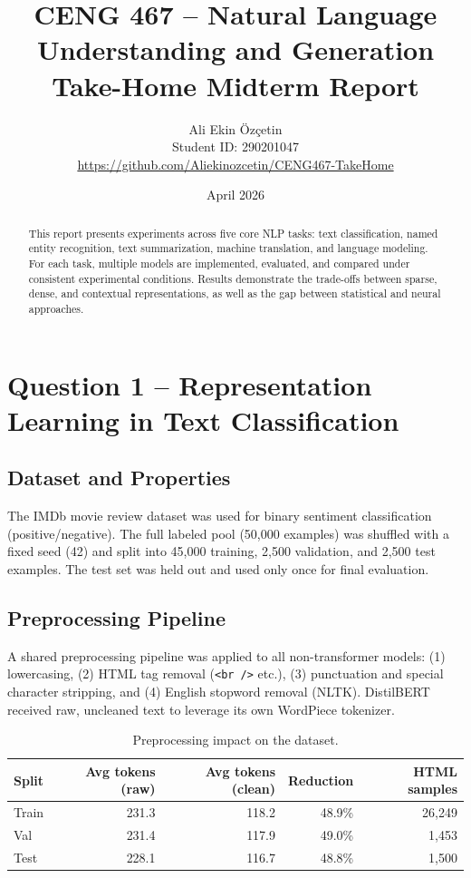 \documentclass[11pt,a4paper]{article}
\title{CENG 467 -- Natural Language Understanding and Generation\\
       \large Take-Home Midterm Report}
\author{Ali Ekin Özçetin \\ Student ID: 290201047 \\ \small\url{https://github.com/Aliekinozcetin/CENG467-TakeHome}}
\date{April 2026}
\begin{document}
\maketitle

\begin{abstract}
This report presents experiments across five core NLP tasks: text classification, named entity recognition, text summarization, machine translation, and language modeling. For each task, multiple models are implemented, evaluated, and compared under consistent experimental conditions. Results demonstrate the trade-offs between sparse, dense, and contextual representations, as well as the gap between statistical and neural approaches.
\end{abstract}

\section{Question 1 -- Representation Learning in Text Classification}

\subsection{Dataset and Properties}

The IMDb movie review dataset was used for binary sentiment classification (positive/negative). The full labeled pool (50{,}000 examples) was shuffled with a fixed seed (42) and split into 45{,}000 training, 2{,}500 validation, and 2{,}500 test examples. The test set was held out and used only once for final evaluation.

\subsection{Preprocessing Pipeline}

A shared preprocessing pipeline was applied to all non-transformer models: (1) lowercasing, (2) HTML tag removal (\texttt{<br />} etc.), (3) punctuation and special character stripping, and (4) English stopword removal (NLTK). DistilBERT received raw, uncleaned text to leverage its own WordPiece tokenizer.

\begin{table}[H]
\centering
\caption{Preprocessing impact on the dataset.}
\label{tab:preproc}
\begin{tabular}{lrrrr}
\toprule
Split & Avg tokens (raw) & Avg tokens (clean) & Reduction & HTML samples \\
\midrule
Train & 231.3 & 118.2 & 48.9\% & 26{,}249 \\
Val   & 231.4 & 117.9 & 49.0\% &  1{,}453 \\
Test  & 228.1 & 116.7 & 48.8\% &  1{,}500 \\
\bottomrule
\end{tabular}
\end{table}
\end{document}

